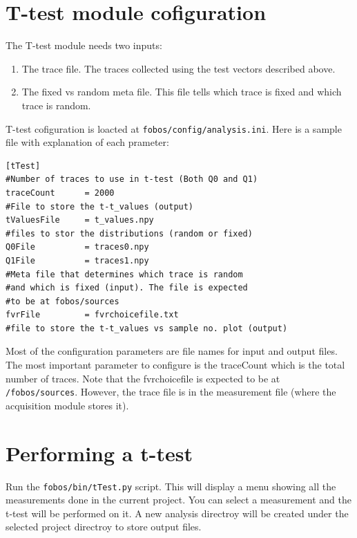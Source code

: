 \section{T-test module cofiguration}

The T-test module needs two inputs:
\begin{enumerate}
 \item The trace file. The traces collected using the test vectors described above.
 \item The fixed vs random meta file. This file tells which trace is fixed and which trace is random.
\end{enumerate}

T-test cofiguration is loacted at \texttt{fobos/config/analysis.ini}.
Here is a sample file with explanation of each prameter:
\begin{verbatim}
[tTest]
#Number of traces to use in t-test (Both Q0 and Q1)
traceCount      = 2000
#File to store the t-t_values (output)
tValuesFile     = t_values.npy
#files to stor the distributions (random or fixed)
Q0File          = traces0.npy
Q1File          = traces1.npy
#Meta file that determines which trace is random
#and which is fixed (input). The file is expected 
#to be at fobos/sources
fvrFile         = fvrchoicefile.txt
#file to store the t-t_values vs sample no. plot (output)
\end{verbatim}

Most of the configuration parameters are file names for input and output files. The most important parameter to configure is the traceCount which is the total number of traces.
Note that the fvrchoicefile is expected to be at \texttt{/fobos/sources}. However, the trace file is in the measurement file (where the acquisition module stores it).

\section{Performing a t-test}

Run the \texttt{fobos/bin/tTest.py} script.
This will display a menu showing all the measurements done in the current project.
You can select a measurement and the t-test will be performed on it. A new analysis directroy will be created under the selected project directroy to store output files.


